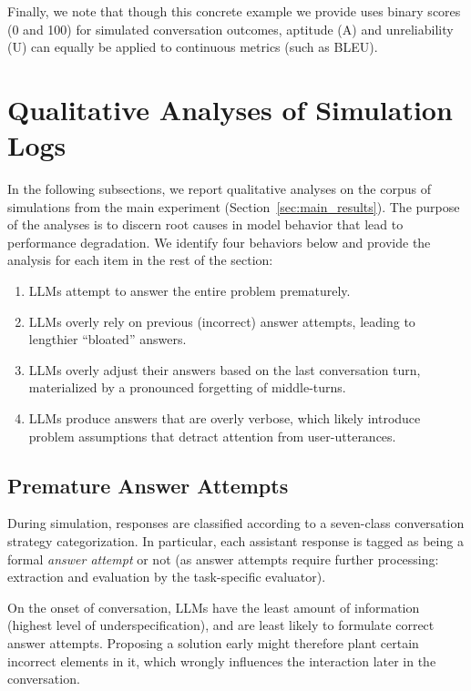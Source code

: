 \documentclass{article}
\begin{document}
\begin{appendices}
Finally, we note that though this concrete example we provide uses binary scores (0 and 100) for simulated conversation outcomes, aptitude (A) and unreliability (U) can equally be applied to continuous metrics (such as BLEU).

\section{Qualitative Analyses of Simulation Logs} \label{app:qualitative}

In the following subsections, we report qualitative analyses on the corpus of simulations from the main experiment (Section~\ref{sec:main_results}). The purpose of the analyses is to discern root causes in model behavior that lead to performance degradation. We identify four behaviors below and provide the analysis for each item in the rest of the section: 

\begin{enumerate}
    \item LLMs attempt to answer the entire problem prematurely.
    \item LLMs overly rely on previous (incorrect) answer attempts, leading to lengthier ``bloated'' answers.
    \item LLMs overly adjust their answers based on the last conversation turn, materialized by a pronounced forgetting of middle-turns.
    \item LLMs produce answers that are overly verbose, which likely introduce problem assumptions that detract attention from user-utterances.
\end{enumerate}

\subsection{Premature Answer Attempts} \label{app:premature_answer_attempt}



During \shardedt simulation, responses are classified according to a seven-class conversation strategy categorization. In particular, each assistant response is tagged as being a formal \textit{answer attempt} or not (as answer attempts require further processing: extraction and evaluation by the task-specific evaluator).

On the onset of conversation, LLMs have the least amount of information (highest level of underspecification), and are least likely to formulate correct answer attempts. Proposing a solution early might therefore plant certain incorrect elements in it, which wrongly influences the interaction later in the conversation.


\end{appendices}
\end{document}
